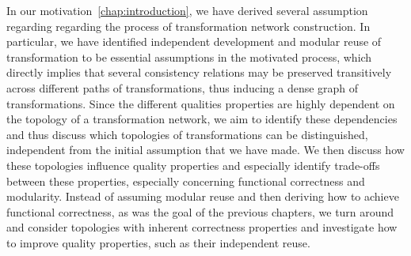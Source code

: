In our motivation~\autoref{chap:introduction}, we have derived several assumption regarding regarding the process of transformation network construction.
In particular, we have identified independent development and modular reuse of transformation to be essential assumptions in the motivated process, which directly implies that several consistency relations may be preserved transitively across different paths of transformations, thus inducing a dense graph of transformations.
Since the different qualities properties are highly dependent on the topology of a transformation network, we aim to identify these dependencies and thus discuss which topologies of transformations can be distinguished, independent from the initial assumption that we have made.
We then discuss how these topologies influence quality properties and especially identify trade-offs between these properties, especially concerning functional correctness and modularity.
Instead of assuming modular reuse and then deriving how to achieve functional correctness, as was the goal of the previous chapters, we turn around and consider topologies with inherent correctness properties and investigate how to improve quality properties, such as their independent reuse.




